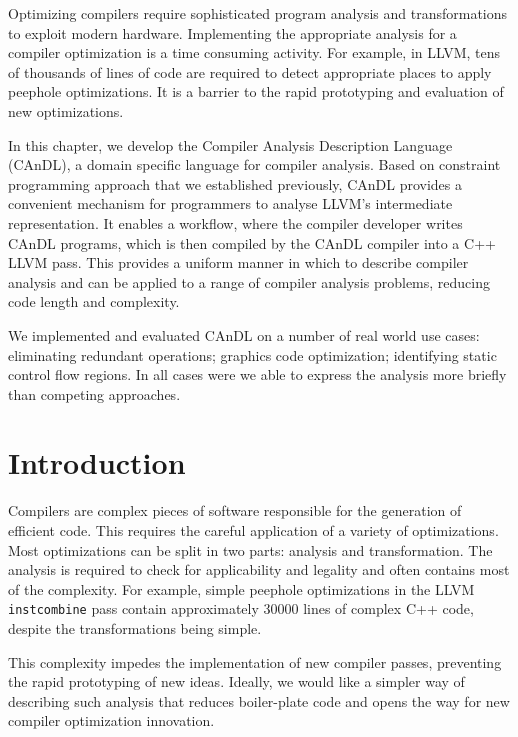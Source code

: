 
    Optimizing compilers require sophisticated program analysis and
    transformations to exploit modern hardware.
    Implementing the appropriate analysis for a compiler optimization is a time
    consuming activity.
    For example, in LLVM, tens of thousands of lines of code are required to
    detect appropriate places to apply peephole optimizations.
    It is a barrier to the rapid prototyping and evaluation of new
    optimizations.

    In this chapter, we develop the Compiler Analysis Description Language
    (CAnDL), a domain specific language for compiler analysis.
    Based on constraint programming approach that we established previously,
    CAnDL provides a convenient mechanism for programmers to analyse LLVM's
    intermediate representation.
    It enables a workflow, where the compiler developer writes CAnDL programs,
    which is then compiled by the CAnDL compiler into a C++ LLVM pass.
    This provides a uniform manner in which to describe compiler analysis and
    can be applied to a range of compiler analysis problems, reducing code
    length and complexity.

    We implemented and evaluated CAnDL on a number of real world use cases:
    eliminating redundant operations; graphics code optimization; identifying
    static control flow regions.
    In all cases were we able to express the analysis more briefly than
    competing approaches.

\section{Introduction}

    Compilers are complex pieces of software responsible for the generation of
    efficient code. 
    This requires the careful application of a variety of optimizations. 
    Most optimizations can be split in two parts: analysis and transformation.
    The analysis is required to check for applicability and legality and often
    contains most of the complexity.
    For example, simple peephole optimizations in the LLVM {\tt instcombine}
    pass contain approximately 30000 lines of complex C++ code, despite the
    transformations being simple.

    This complexity impedes the implementation of new compiler
    passes, preventing the rapid prototyping of new ideas.
    Ideally, we would like a simpler way of describing such analysis that
    reduces boiler-plate code and opens the way for new compiler optimization
    innovation.

